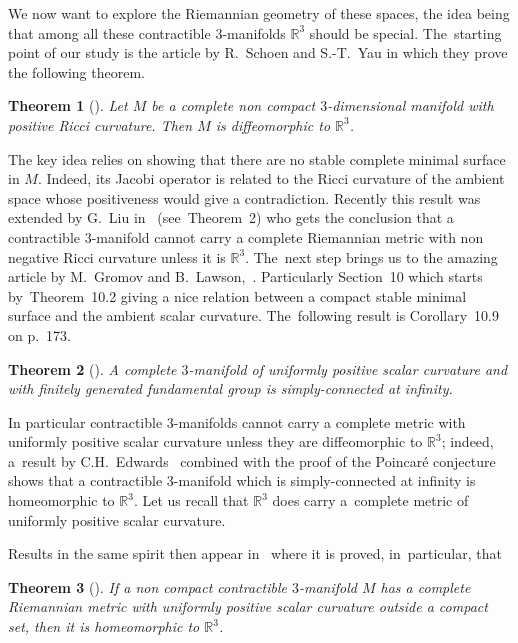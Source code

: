\documentclass[pdftex]{sigma}
\numberwithin{equation}{section}
\newtheorem{theor}{Theorem}[section]
\begin{document}
We now want to explore the Riemannian geometry of these spaces, the idea being that among all these contractible $3$-manifolds $\mathbb{R}^{3}$ should be special. The~starting point of our study is the article
\cite{SchoenYau:stable} by R.~Schoen and S.-T.~Yau in which they prove the following theorem.

\begin{theor}[{\cite[Theorem~3]{SchoenYau:stable}}]
Let $M$ be a complete non compact $3$-dimensional manifold with positive Ricci curvature. Then $M$ is diffeomorphic to $\mathbb{R}^{3}$.
\end{theor}

The key idea relies on showing that there are no stable complete minimal surface in $M$. \mbox{Indeed}, its Jacobi operator is related to the Ricci curvature of the ambient space whose positiveness would give a contradiction. Recently this result was extended by G.~Liu in~\cite{Liu} (see~Theorem~2)
who gets the conclusion that a contractible $3$-manifold cannot carry a complete Riemannian metric with non negative Ricci curvature unless it is $\mathbb{R}^{3}$. The~next step brings us to the amazing article by M.~Gromov and B.~Lawson,~\cite{GromovLawson}. Particularly Section~10 which starts by~Theorem~10.2 giving a nice relation between a compact stable minimal surface and the ambient scalar curvature. The~following result is Corollary~10.9 on p.~173.

\begin{theor}[{\cite[Corollary~10.9]{GromovLawson}}]
A complete $3$-manifold of uniformly positive scalar curvature and with finitely generated fundamental group is simply-connected at infinity.
\end{theor}

In particular contractible $3$-manifolds cannot carry a complete metric with uniformly positive scalar curvature unless they are diffeomorphic to $\mathbb{R}^{3}$; indeed, a~result by C.H.~Edwards~\cite{Edw} combined
with the proof of the Poincar\'e conjecture shows that a contractible $3$-manifold which is simply-connected at infinity is homeomorphic to $\mathbb{R}^3$. Let us recall that $\mathbb{R}^3$ does carry a~complete metric of uniformly positive scalar curvature.

Results in the same spirit then appear in~\cite{cwy:taming} where it is proved, in~particular, that

\begin{theor}[{\cite[Theorem~4.4]{cwy:taming}}]\label{cwy}
If a non compact contractible $3$-manifold $M$ has a complete Riemannian metric with uniformly positive scalar curvature outside a compact set, then it is homeomorphic to $\mathbb{R}^{3}$.
\end{theor}
\end{document}
